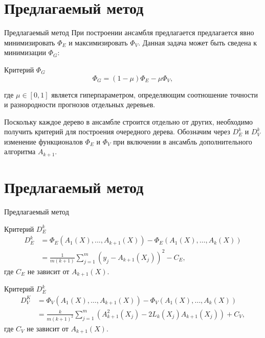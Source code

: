 \documentclass[10pt,pdf,hyperref={unicode}]{beamer}
\begin{document}
\section{Предлагаемый метод}
\begin{frame}{Предлагаемый метод}
    При построении ансамбля предлагается предлагается явно минимизировать $\Phi_E$ и максимизировать $\Phi_V$. Данная задача может быть сведена к минимизации $\Phi_G$:
\begin{block}{Критерий $\Phi_G$}
    \begin{equation*}
    \Phi_G = (1 - \mu) \Phi_E - \mu \Phi_V,
\end{equation*}
\end{block}
    где $\mu \in [0, 1]$ является гиперпараметром, определяющим соотношение точности и разнородности прогнозов отдельных деревьев. 

    Поскольку каждое дерево в ансамбле строится отдельно от других, необходимо получить критерий для построения очередного дерева. Обозначим через $D_E^k$ и $D_V^k$ изменение функционалов $\Phi_E$ и $\Phi_V$ при включении в ансамбль дополнительного алгоритма $A_{k+1}$. 
\end{frame}

\section{Предлагаемый метод}
\begin{frame}{Предлагаемый метод}
\begin{block}{Критерий $D_E^k$}
    \begin{align*}
    D_E^k &= \Phi_E(A_1(X), ..., A_{k+1}(X)) - \Phi_E(A_1(X), \dots, A_k(X)) \\
    &= \frac{1}{m(k+1)}\sum_{j=1}^{m}(y_j - A_{k+1}(X_j))^2 - C_E,
    \end{align*}
    где $C_E$ не зависит от $A_{k+1}(X)$.
\end{block}
\begin{block}{Критерий $D_E^k$}
    \begin{align*}
    D_V^K &= \Phi_V(A_1(X), \dots, A_{k+1}(X))-\Phi_V(A_1(X), \dots, A_k(X)) \\
    &= \frac{k}{m(k+1)^2} \sum_{j=1}^{m} (A_{k+1}^2(X_j) - 2L_k(X_j)A_{k+1}(X_j)) + C_V,
    \end{align*}
    где $C_V$ не зависит от $A_{k+1}(X)$.
\end{block}
\end{frame}
\end{document}

